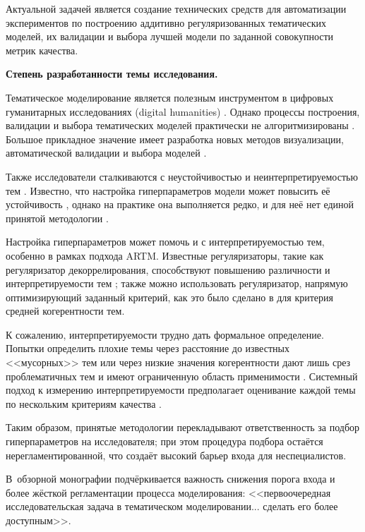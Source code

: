 Актуальной задачей является создание технических средств для автоматизации экспериментов по построению аддитивно регуляризованных тематических моделей, их валидации и выбора лучшей модели по заданной совокупности метрик качества.

\textbf{Степень разработанности темы исследования.}

Тематическое моделирование является полезным инструментом в цифровых гуманитарных исследованиях (digital humanities) \cite{grimmer2013text,paakkonen2020humanistic}. Однако процессы построения, валидации и выбора тематических моделей практически не алгоритмизированы \cite{paakkonen2020humanistic}. Большое прикладное значение имеет разработка новых методов визуализации, автоматической валидации и выбора моделей \cite{dh_sea}.

Также исследователи сталкиваются с неустойчивостью \cite{mantyla2018measuring} и неинтерпретируемостью тем \cite{boydcare}. Известно, что настройка гиперпараметров модели может повысить её устойчивость \cite{agrawal2018wrong}, однако на практике она выполняется редко, и для неё нет единой принятой методологии  \cite{agrawal2018wrong,chen2016survey}.

Настройка гиперпараметров может помочь и с интерпретируемостью тем, особенно в рамках подхода ARTM. Известные регуляризаторы, такие как регуляризатор декоррелирования, способствуют повышению различности и интерпретируемости тем \cite{popov_hier}; также можно использовать  регуляризатор, напрямую оптимизирующий заданный критерий, как это было сделано в \cite{4keys} для критерия средней когерентности тем.

К сожалению, интерпретируемости трудно дать формальное определение. Попытки определить плохие темы через расстояние до известных <<мусорных>> тем или через низкие значения когерентности дают лишь срез проблематичных тем и имеют ограниченную область применимости \cite{boydcare}. Системный подход к измерению интерпретируемости предполагает оценивание каждой темы по нескольким критериям качества \cite{fan2019assessing}.

Таким образом, принятые методологии перекладывают ответственность за подбор гиперпараметров на исследователя; при этом процедура подбора остаётся нерегламентированной, что создаёт высокий барьер входа для неспециалистов.

В~обзорной монографии \cite{fntir2017applications} подчёркивается важность снижения порога входа и более жёсткой регламентации процесса моделирования: <<первоочередная исследовательская задача в тематическом моделировании... сделать его более доступным>>.

